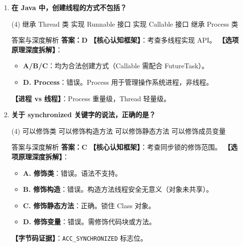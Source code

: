 ﻿\documentclass[12pt, a4paper]{ctexart}
\newcommand{\code}[1]{\texttt{#1}}
\begin{document}
\begin{enumerate}[label=\textbf{\arabic*.}, itemsep=1em]
	\item \textbf{在 Java 中，创建线程的方式不包括？}
	      \begin{tasks}(4)
		      \task 继承 Thread 类 \task 实现 Runnable 接口
		      \task 实现 Callable 接口 \task 继承 Process 类
	      \end{tasks}
	      \begin{bluebox}{答案与深度解析}
		      \textbf{答案：D}
		      \textbf{【核心认知框架】}：考查多线程实现 API。
		      \textbf{【选项原理深度拆解】}：
		      \begin{itemize}[leftmargin=*, nosep]
			      \item \textbf{A/B/C}：均为合法创建方式（Callable 需配合 FutureTask）。
			      \item \textbf{D. Process}：错误。Process 用于管理操作系统进程，非线程。
		      \end{itemize}
		      \textbf{【进程 vs 线程】}：Process 重量级，Thread 轻量级。
	      \end{bluebox}

	\item \textbf{关于 synchronized 关键字的说法，正确的是？}
	      \begin{tasks}(4)
		      \task 可以修饰类 \task 可以修饰构造方法
		      \task 可以修饰静态方法 \task 可以修饰成员变量
	      \end{tasks}
	      \begin{bluebox}{答案与深度解析}
		      \textbf{答案：C}
		      \textbf{【核心认知框架】}：考查同步锁的修饰范围。
		      \textbf{【选项原理深度拆解】}：
		      \begin{itemize}[leftmargin=*, nosep]
			      \item \textbf{A. 修饰类}：错误。语法不支持。
			      \item \textbf{B. 修饰构造}：错误。构造方法线程安全无意义（对象未共享）。
			      \item \textbf{C. 修饰静态方法}：正确。锁住 Class 对象。
			      \item \textbf{D. 修饰变量}：错误。需修饰代码块或方法。
		      \end{itemize}
		      \textbf{【字节码证据】}：\code{ACC\_SYNCHRONIZED} 标志位。
	      \end{bluebox}


\end{enumerate}
\end{document}
